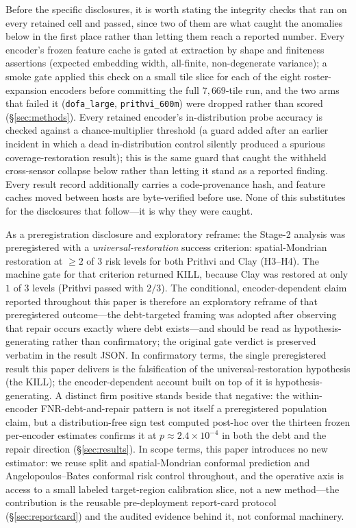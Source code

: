 \documentclass[11pt]{article}
\begin{document}
Before the specific disclosures, it is worth stating the integrity checks that ran on every retained cell
and passed, since two of them are what caught the anomalies below in the first place rather than letting
them reach a reported number. Every encoder's frozen feature cache is gated at extraction by shape and
finiteness assertions (expected embedding width, all-finite, non-degenerate variance); a smoke gate
applied this check on a small tile slice for each of the eight roster-expansion encoders before committing
the full $7{,}669$-tile run, and the two arms that failed it (\texttt{dofa\_large}, \texttt{prithvi\_600m})
were dropped rather than scored (\S\ref{sec:methods}). Every retained encoder's in-distribution probe
accuracy is checked against a chance-multiplier threshold (a guard added after an earlier incident in
which a dead in-distribution control silently produced a spurious coverage-restoration result); this is
the same guard that caught the withheld cross-sensor collapse below rather than letting it stand as a
reported finding. Every result record additionally carries a code-provenance hash, and feature caches
moved between hosts are byte-verified before use. None of this substitutes for the disclosures that
follow---it is why they were caught.

As a preregistration disclosure and exploratory reframe: the Stage-2 analysis was preregistered with a
\emph{universal-restoration} success criterion: spatial-Mondrian restoration at $\ge2$ of 3 risk levels for
both Prithvi and Clay (H3--H4). The machine gate for that criterion returned KILL, because
Clay was restored at only $1$ of $3$ levels (Prithvi passed with $2/3$). The conditional, encoder-dependent
claim reported throughout this paper is therefore an exploratory reframe of that preregistered
outcome---the debt-targeted framing was adopted after observing that repair occurs exactly where
debt exists---and should be read as hypothesis-generating rather than confirmatory; the original gate
verdict is preserved verbatim in the result JSON. In confirmatory terms, the single preregistered result this
paper delivers is the falsification of the universal-restoration hypothesis (the KILL); the
encoder-dependent account built on top of it is hypothesis-generating. A distinct firm positive stands
beside that negative: the within-encoder FNR-debt-and-repair pattern is not itself a preregistered
population claim, but a distribution-free sign test computed post-hoc over the thirteen frozen
per-encoder estimates confirms it at $p\approx2.4\times10^{-4}$ in both the debt and the repair
direction (\S\ref{sec:results}). In scope terms, this paper
introduces no new estimator: we reuse split and spatial-Mondrian conformal prediction
\citep{vovk2005algorithmic,vovk2003mondrian} and Angelopoulos--Bates conformal risk control
\citep{angelopoulos2024crc} throughout, and the operative axis is access to a small labeled target-region
calibration slice, not a new method---the contribution is the reusable pre-deployment report-card protocol
(\S\ref{sec:reportcard}) and the audited evidence behind it, not conformal machinery.
\end{document}
